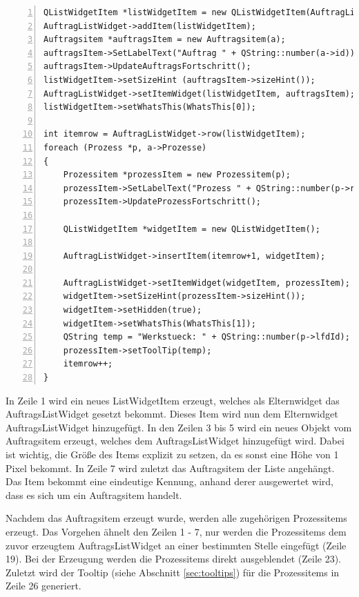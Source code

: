 \begin{lstlisting}[frame=single, breaklines=true, numbers=left, stepnumber=2, firstnumber=1, numberstyle = \tiny, caption=Funktionsinhalt AddAuftragsItem ,label=lst:AddAuftragsItem]
QListWidgetItem *listWidgetItem = new QListWidgetItem(AuftragListWidget);
AuftragListWidget->addItem(listWidgetItem);
Auftragsitem *auftragsItem = new Auftragsitem(a);
auftragsItem->SetLabelText("Auftrag " + QString::number(a->id));
auftragsItem->UpdateAuftragsFortschritt();
listWidgetItem->setSizeHint (auftragsItem->sizeHint());
AuftragListWidget->setItemWidget(listWidgetItem, auftragsItem);
listWidgetItem->setWhatsThis(WhatsThis[0]);

int itemrow = AuftragListWidget->row(listWidgetItem);
foreach (Prozess *p, a->Prozesse)
{
    Prozessitem *prozessItem = new Prozessitem(p);
    prozessItem->SetLabelText("Prozess " + QString::number(p->referenzId));
    prozessItem->UpdateProzessFortschritt();

    QListWidgetItem *widgetItem = new QListWidgetItem();

    AuftragListWidget->insertItem(itemrow+1, widgetItem);

    AuftragListWidget->setItemWidget(widgetItem, prozessItem);
    widgetItem->setSizeHint(prozessItem->sizeHint());
    widgetItem->setHidden(true);
    widgetItem->setWhatsThis(WhatsThis[1]);
    QString temp = "Werkstueck: " + QString::number(p->lfdId);
    prozessItem->setToolTip(temp);
    itemrow++;
}
\end{lstlisting}

In Zeile 1 wird ein neues ListWidgetItem erzeugt, welches als Elternwidget das AuftragsListWidget gesetzt bekommt. Dieses Item wird nun dem Elternwidget AuftragsListWidget hinzugefügt. In den Zeilen 3 bis 5 wird ein neues Objekt vom Auftragsitem erzeugt, welches dem AuftragsListWidget hinzugefügt wird. Dabei ist wichtig, die Größe des Items explizit zu setzen, da es sonst eine Höhe von 1 Pixel bekommt. In Zeile 7 wird zuletzt das Auftragsitem der Liste angehängt. Das Item bekommt eine eindeutige Kennung, anhand derer ausgewertet wird, dass es sich um ein Auftragsitem handelt.

Nachdem das Auftragsitem erzeugt wurde, werden alle zugehörigen Prozessitems erzeugt. Das Vorgehen ähnelt den Zeilen 1 - 7, nur werden die Prozessitems dem zuvor erzeugtem AuftragsListWidget an einer bestimmten Stelle eingefügt (Zeile 19). Bei der Erzeugung werden die Prozessitems direkt ausgeblendet (Zeile 23). Zuletzt wird der Tooltip (siehe Abschnitt \ref{sec:tooltips}) für die Prozessitems in Zeile 26 generiert.

